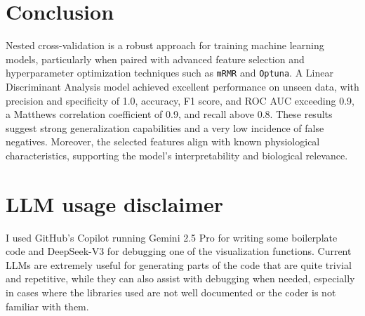 \documentclass[12pt]{article}
\begin{document}
\section{Conclusion}

Nested cross-validation is a robust approach for training machine learning
models, particularly when paired with advanced feature selection and
hyperparameter optimization techniques such as \texttt{mRMR} and
\texttt{Optuna}. A Linear Discriminant Analysis model achieved excellent
performance on unseen data, with precision and specificity of 1.0, accuracy, F1
score, and ROC AUC exceeding 0.9, a Matthews correlation coefficient of 0.9, and
recall above 0.8. These results suggest strong generalization capabilities and a
very low incidence of false negatives. Moreover, the selected features align
with known physiological characteristics, supporting the model's
interpretability and biological relevance.


\section{LLM usage disclaimer}
I used GitHub's Copilot running Gemini 2.5 Pro for writing some boilerplate
code and DeepSeek-V3 for debugging one of the visualization functions. Current
LLMs are extremely useful for generating parts of the code that are quite
trivial and repetitive, while they can also assist with debugging when needed,
especially in cases where the libraries used are not well documented or the
coder is not familiar with them.




\end{document}
